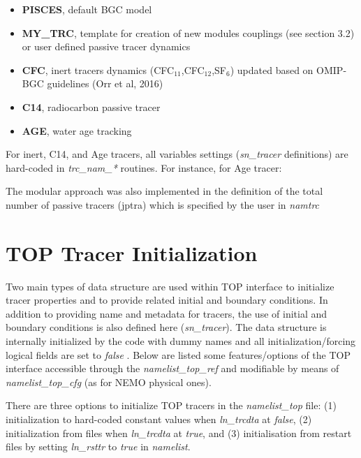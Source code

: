 \documentclass[../main/TOP_manual]{subfiles}
\begin{document}
\begin{itemize}
        \item \textbf{PISCES}, default BGC model
        \item \textbf{MY\_TRC}, template for creation of new modules couplings (see section 3.2) or user defined passive tracer dynamics
        \item \textbf{CFC}, inert tracers dynamics (CFC$_{11}$,CFC$_{12}$,SF$_{6}$) updated based on OMIP-BGC guidelines (Orr et al, 2016)
        \item \textbf{C14}, radiocarbon passive tracer
        \item \textbf{AGE}, water age tracking
\end{itemize}

For inert, C14, and Age tracers, all variables settings (\textit{sn\_tracer} definitions) are hard-coded in \textit{trc\_nam\_*} routines. For instance, for Age tracer:

The modular approach was also implemented in the definition of the total number of passive tracers (jptra) which is specified by the user in  \textit{namtrc}

\section{ TOP Tracer Initialization}

Two main types of data structure are used within TOP interface to initialize tracer properties and to provide related initial and boundary conditions. 
In addition to providing name and metadata for tracers, the use of initial and boundary conditions is also defined here (\textit{sn\_tracer}).
The data structure is internally initialized by the code with dummy names and all initialization/forcing logical fields are set to \textit{false} .
Below are listed some features/options of the TOP interface accessible through the \textit{namelist\_top\_ref} and modifiable by means of \textit{namelist\_top\_cfg} (as for NEMO physical ones).

There are three options to initialize TOP tracers in the \textit{namelist\_top } file: (1) initialization to hard-coded constant values when \textit{ln\_trcdta} at \textit{false}, (2) initialization from files when \textit{ln\_trcdta} at \textit{true}, and (3) initialisation from restart files by setting \textit{ln\_rsttr} to \textit{true} in \textit{namelist}.
\end{document}
